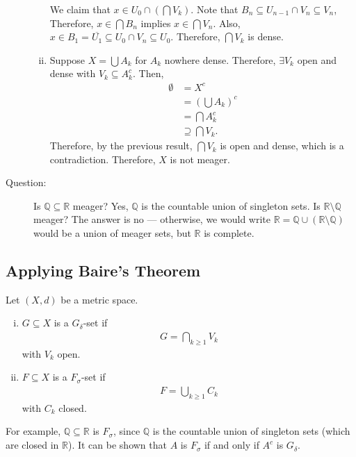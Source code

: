 \documentclass[10pt]{extarticle}
\newcommand{\Q}{\mathbb{Q}}
\newcommand{\R}{\mathbb{R}}
\begin{document}
\begin{description}
\begin{enumerate}[(i)]
          We claim that $x\in U_{0}\cap \left(\bigcap V_k\right)$. Note that $B_n \subseteq U_{n-1}\cap V_n \subseteq V_n$, Therefore, $x\in \bigcap B_n$ implies $x\in \bigcap V_n$. Also, $x\in B_1=\overline{U_1} \subseteq U_0\cap V_n \subseteq U_0$. Therefore, $\bigcap V_k$ is dense.
        \item Suppose $X = \bigcup A_k$ for $A_k$ nowhere dense. Therefore, $\exists V_k$ open and dense with $V_k\subseteq A_k^c$. Then,
          \begin{align*}
            \emptyset &= X^c\\
                      &= \left(\bigcup A_k\right)^c\\
                      &= \bigcap A_k^c\\
                      &\supseteq \bigcap V_k.
          \end{align*}
          Therefore, by the previous result, $\bigcap V_k$ is open and dense, which is a contradiction. Therefore, $X$ is not meager.
      \end{enumerate}
    \item[Question:] Is $\Q\subseteq \R$ meager? Yes, $\Q$ is the countable union of singleton sets. Is $\R\setminus \Q$ meager? The answer is no --- otherwise, we would write $\R = \Q \cup (\R\setminus \Q)$ would be a union of meager sets, but $\R$ is complete.
  \end{description}
  \subsection{Applying Baire's Theorem}%
  Let $(X,d)$ be a metric space.
  \begin{enumerate}[(i)]
    \item $G\subseteq X$ is a $G_{\delta}$-set if
      \begin{align*}
        G = \bigcap_{k\geq 1} V_k
      \end{align*}
      with $V_k$ open.
    \item $F\subseteq X$ is a $F_{\sigma}$-set if
      \begin{align*}
        F = \bigcup_{k\geq 1}C_k
      \end{align*}
      with $C_k$ closed.
  \end{enumerate}
  For example, $\Q\subseteq \R$ is $F_{\sigma}$, since $\Q$ is the countable union of singleton sets (which are closed in $\R$). It can be shown that $A$ is $F_{\sigma}$ if and only if $A^{c}$ is $G_{\delta}$.\\ 
\end{document}
